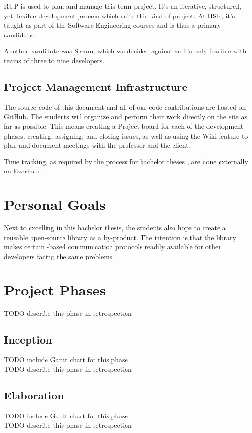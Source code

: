 RUP is used to plan and manage this term project. It’s an iterative,
structured, yet flexible development process which suits this kind of project.
At HSR, it’s taught as part of the Software Engineering courses and is thus a
primary candidate.

Another candidate was Scrum, which we decided against as it’s only feasible
with teams of three to nine developers.

\subsection*{Project Management Infrastructure}
The source code of this document and all of our code contributions are hosted
on GitHub. The students will organize and perform their work directly on the
site as far as possible. This means creating a Project board for each of the
development phases, creating, assigning, and closing issues, as well as using
the Wiki feature to plan and document meetings with the professor and the
client.

Time tracking, as required by the process for bachelor theses
\cite{hsr:thesis-rules}, are done externally on Everhour.

\section*{Personal Goals}
Next to excelling in this bachelor thesis, the students also hope to create a
reusable open-source library as a by-product. The intention is that the library
makes certain \zmq-based communication protocols readily available for other
developers facing the same problems.

\section*{Project Phases}
TODO describe this phase in retrospection\\

\subsection*{Inception}
TODO include Gantt chart for this phase\\
TODO describe this phase in retrospection\\

\subsection*{Elaboration}
TODO include Gantt chart for this phase\\
TODO describe this phase in retrospection\\

